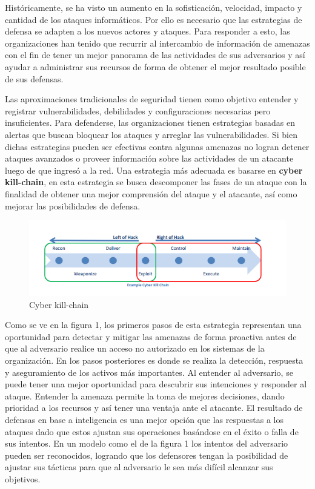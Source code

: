 Históricamente, se ha visto un aumento en la sofisticación, velocidad, impacto y 
cantidad de los ataques informáticos. Por ello es necesario que las estrategias 
de defensa se adapten a los nuevos actores y ataques. Para responder a esto, las 
organizaciones han tenido que recurrir al intercambio de información de amenazas 
con el fin de tener un mejor panorama de las actividades de sus adversarios 
y así ayudar a administrar sus recursos de forma de obtener el mejor resultado 
posible de sus defensas. 

Las aproximaciones tradicionales de seguridad tienen como objetivo entender y 
registrar vulnerabilidades, debilidades y configuraciones necesarias pero 
insuficientes. Para defenderse, las organizaciones tienen estrategias basadas en 
alertas que buscan bloquear los ataques y arreglar las vulnerabilidades. Si bien dichas estrategias pueden ser efectivas contra algunas 
amenazas no logran detener ataques avanzados o proveer información sobre las 
actividades de un atacante luego de que ingresó a la red. Una estrategia más 
adecuada es basarse en \textbf{cyber kill-chain}, en esta estrategia se busca 
descomponer las fases de un ataque con la finalidad de obtener una mejor 
comprensión del ataque y el atacante, así como mejorar las posibilidades de 
defensa.

\begin{figure}[ht!]
  \centering
  \includegraphics[scale=0.55]{./images/killChain.png}
    \caption{Cyber kill-chain \protect\cite{b1}}
\end{figure}

Como se ve en la figura 1, los primeros pasos de esta estrategia representan una 
oportunidad para detectar y mitigar las amenazas de forma proactiva antes de que 
al adversario realice un acceso no autorizado en los sistemas de la 
organización. En los pasos posteriores es donde se realiza la detección, 
respuesta y aseguramiento de los activos más importantes. Al entender al 
adversario, se puede tener una mejor oportunidad para descubrir sus intenciones 
y responder al ataque. Entender la amenaza permite la toma de mejores 
decisiones, dando prioridad a los recursos y así tener una ventaja ante el atacante. 
El resultado de defensas en base a inteligencia es una mejor opción que las 
respuestas a los ataques dado que estos ajustan sus operaciones basándose en el 
éxito o falla de sus intentos. En un modelo como el de la figura 1 los intentos 
del adversario pueden ser reconocidos, logrando que los defensores tengan la 
posibilidad de ajustar sus tácticas para que al adversario le sea más 
difícil alcanzar sus objetivos.

